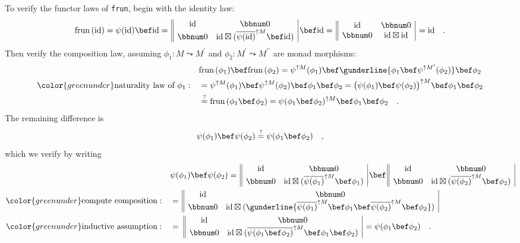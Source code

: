 To verify the functor laws of \lstinline!frun!, begin with the identity
law:
\[
\text{frun}\,(\text{id})=\psi(\text{id})\bef\text{id}=\,\begin{array}{||cc|}
\text{id} & \bbnum 0\\
\bbnum 0 & \text{id}\boxtimes(\overline{\psi(\text{id)}}^{\uparrow M}\bef\text{id})
\end{array}\,\bef\text{id}=\,\begin{array}{||cc|}
\text{id} & \bbnum 0\\
\bbnum 0 & \text{id}\boxtimes\text{id}
\end{array}\,=\text{id}\quad.
\]
Then verify the composition law, assuming $\phi_{1}:M\leadsto M^{\prime}$
and $\phi_{2}:M^{\prime}\leadsto M^{\prime\prime}$ are monad morphisms:
\begin{align*}
 & \text{frun}\,(\phi_{1})\bef\text{frun}\,(\phi_{2})=\psi^{\uparrow M}(\phi_{1})\bef\gunderline{\phi_{1}\bef\psi^{\uparrow M^{\prime}}(\phi_{2})}\bef\phi_{2}\\
{\color{greenunder}\text{naturality law of }\phi_{1}:}\quad & =\psi^{\uparrow M}(\phi_{1})\bef\psi^{\uparrow M}(\phi_{2})\bef\phi_{1}\bef\phi_{2}=\big(\psi(\phi_{1})\bef\psi(\phi_{2})\big)^{\uparrow M}\bef\phi_{1}\bef\phi_{2}\\
 & \overset{?}{=}\text{frun}\,(\phi_{1}\bef\phi_{2})=\psi(\phi_{1}\bef\phi_{2})^{\uparrow M}\bef\phi_{1}\bef\phi_{2}\quad.
\end{align*}
The remaining difference is
\[
\psi(\phi_{1})\bef\psi(\phi_{2})\overset{?}{=}\psi(\phi_{1}\bef\phi_{2})\quad,
\]
which we verify by writing
\begin{align*}
 & \psi(\phi_{1})\bef\psi(\phi_{2})=\,\begin{array}{||cc|}
\text{id} & \bbnum 0\\
\bbnum 0 & \text{id}\boxtimes(\overline{\psi(\phi_{1}\text{)}}^{\uparrow M}\bef\phi_{1})
\end{array}\,\bef\,\begin{array}{||cc|}
\text{id} & \bbnum 0\\
\bbnum 0 & \text{id}\boxtimes(\overline{\psi(\phi_{2}\text{)}}^{\uparrow M}\bef\phi_{2})
\end{array}\\
{\color{greenunder}\text{compute composition}:}\quad & =\,\begin{array}{||cc|}
\text{id} & \bbnum 0\\
\bbnum 0 & \text{id}\boxtimes(\gunderline{\overline{\psi(\phi_{1}\text{)}}^{\uparrow M}\bef\phi_{1}\bef\overline{\psi(\phi_{2}\text{)}}^{\uparrow M}\bef\phi_{2}})
\end{array}\\
{\color{greenunder}\text{inductive assumption}:}\quad & =\,\,\begin{array}{||cc|}
\text{id} & \bbnum 0\\
\bbnum 0 & \text{id}\boxtimes(\overline{\psi(\phi_{1}\bef\phi_{2}\text{)}}^{\uparrow M}\bef\phi_{1}\bef\phi_{2})
\end{array}\,=\psi(\phi_{1}\bef\phi_{2})\quad.
\end{align*}


